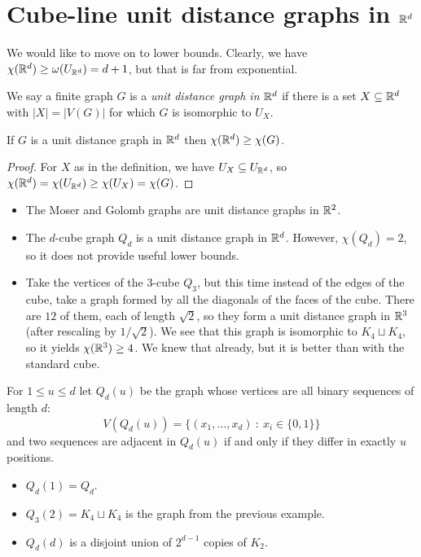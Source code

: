 \section{Cube-line unit distance graphs in $\mathbb{R}^d$}
We would like to move on to lower bounds. Clearly, we have $\chi(\mathbb{R}^d)\geq \omega(U_{\mathbb{R}^d})=d+1$, but that is far from exponential. 

\begin{definition}
We say a finite graph $G$ is a \emph{unit distance graph in $\mathbb{R}^d$} if there is a set $X\subseteq \mathbb{R}^d$  with $|X|=|V(G)|$ for which $G$ is isomorphic to $U_X$.
\end{definition}

\begin{lemma}
If $G$ is a unit distance graph in $\mathbb{R}^d$ then $\chi(\mathbb{R}^d)\geq \chi(G)$.
\end{lemma}
\begin{proof} For $X$ as in the definition, we have
$U_X\subseteq U_{\mathbb{R}^d}$, so $\chi(\mathbb{R}^d)=\chi(U_{\mathbb{R}^d})\geq \chi(U_X)=\chi(G)$.
\end{proof}

\begin{example}
\begin{itemize}
\item The Moser and Golomb graphs are unit distance graphs in $\mathbb{R}^2$.
\item The $d$-cube graph $Q_d$ is a unit distance graph in $\mathbb{R}^d$. However, $\chi(Q_d)=2$, so it does not provide useful lower bounds.
\item Take the vertices of the $3$-cube $Q_3$, but this time instead of the edges of the cube, take a graph formed by all the diagonals of the faces of the cube. There are $12$ of them, each of length $\sqrt{2}$, so they form a unit distance graph in $\mathbb{R}^3$ (after rescaling by $1/\sqrt{2}$). We see that this graph  is isomorphic to $K_4\sqcup K_4$, so it yields $\chi(\mathbb{R}^3)\geq 4$. We knew that already, but it is better than with the standard cube.
\end{itemize}
\end{example}

\begin{definition}
For $1\leq u\leq d$ let $Q_d(u)$ be the graph whose vertices are all binary sequences of length $d$:
$$V(Q_d(u))=\{(x_1,\ldots,x_d)~:~x_i\in\{0,1\}\}$$
and two sequences are adjacent in $Q_d(u)$ if and only if they differ in exactly $u$ positions.
\end{definition}
\begin{example}
\begin{itemize}
\item $Q_d(1)=Q_d$.
\item $Q_3(2)=K_4\sqcup K_4$ is the graph from the previous example.
\item $Q_d(d)$ is a disjoint union of $2^{d-1}$ copies of $K_2$.
\end{itemize}
\end{example}

